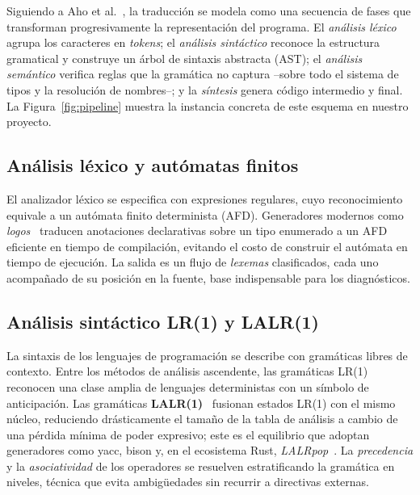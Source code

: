 \documentclass[14pts,runningheads,a4paper]{llncs}
\begin{document}
Siguiendo a Aho et al.~\cite{aho2006compilers}, la traducci\'on se modela como una
secuencia de fases que transforman progresivamente la representaci\'on del programa.
El \emph{an\'alisis l\'exico} agrupa los caracteres en \emph{tokens}; el \emph{an\'alisis
sint\'actico} reconoce la estructura gramatical y construye un \'arbol de sintaxis
abstracta (AST); el \emph{an\'alisis sem\'antico} verifica reglas que la gram\'atica no
captura --sobre todo el sistema de tipos y la resoluci\'on de nombres--; y la
\emph{s\'intesis} genera c\'odigo intermedio y final. La Figura~\ref{fig:pipeline}
muestra la instancia concreta de este esquema en nuestro proyecto.

\subsection{An\'alisis l\'exico y aut\'omatas finitos}

El analizador l\'exico se especifica con expresiones regulares, cuyo
reconocimiento equivale a un aut\'omata finito determinista (AFD). Generadores
modernos como \emph{logos}~\cite{logos} traducen anotaciones declarativas sobre un
tipo enumerado a un AFD eficiente en tiempo de compilaci\'on, evitando el costo de
construir el aut\'omata en tiempo de ejecuci\'on. La salida es un flujo de
\emph{lexemas} clasificados, cada uno acompa\~nado de su posici\'on en la fuente, base
indispensable para los diagn\'osticos.

\subsection{An\'alisis sint\'actico LR(1) y LALR(1)}

La sintaxis de los lenguajes de programaci\'on se describe con gram\'aticas libres de
contexto. Entre los m\'etodos de an\'alisis ascendente, las gram\'aticas
LR(1)~\cite{knuth1965translation} reconocen una clase amplia de lenguajes
deterministas con un s\'imbolo de anticipaci\'on. Las gram\'aticas
\textbf{LALR(1)}~\cite{deroon1989lalr} fusionan estados LR(1) con el mismo n\'ucleo,
reduciendo dr\'asticamente el tama\~no de la tabla de an\'alisis a cambio de una p\'erdida
m\'inima de poder expresivo; este es el equilibrio que adoptan generadores como yacc,
bison y, en el ecosistema Rust, \emph{LALRpop}~\cite{lalrpop}. La \emph{precedencia} y
la \emph{asociatividad} de los operadores se resuelven estratificando la gram\'atica
en niveles, t\'ecnica que evita ambig\"uedades sin recurrir a directivas externas.
\end{document}
